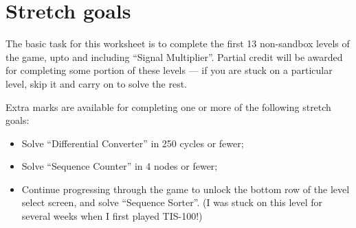 \documentclass{../../../fal_assignment}
\begin{document}
\begin{center}
\end{center}

\section*{Stretch goals}

The basic task for this worksheet is to complete the first 13 non-sandbox levels of the game, upto and including ``Signal Multiplier''.
Partial credit will be awarded for completing some portion of these levels --- if you are stuck on a particular level, skip it and carry on to solve the rest.

Extra marks are available for completing one or more of the following stretch goals:

	\begin{itemize}
		\item Solve ``Differential Converter'' in 250 cycles or fewer;
		\item Solve ``Sequence Counter'' in 4 nodes or fewer;
		\item Continue progressing through the game to unlock the bottom row of the level select screen, and solve ``Sequence Sorter''. (I was stuck on this level for several weeks when I first played TIS-100!)
	\end{itemize}
\end{document}
